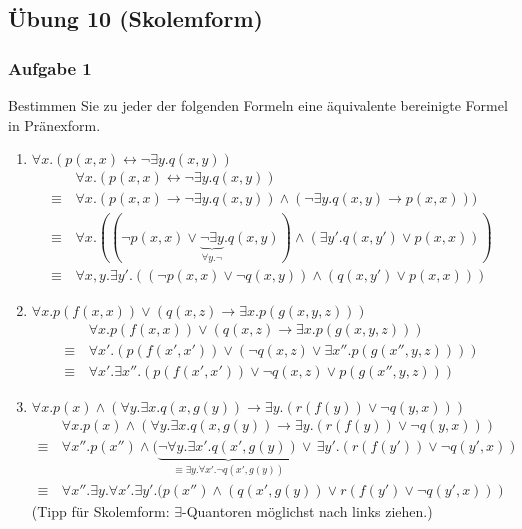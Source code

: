 \newcommand{\HRule}[2]{\par
  \vspace*{\dimexpr-\parskip-\baselineskip+#2}
  \noindent\rule{#1}{0.2mm}\par
  \vspace*{\dimexpr-\parskip-.5\baselineskip+#2}}

\subsection*{Übung 10 (Skolemform)}
\subsubsection*{Aufgabe 1}
Bestimmen Sie zu jeder der folgenden Formeln eine äquivalente bereinigte Formel in Pränexform.
\begin{enumerate}
\item $\forall x.(p(x,x) \leftrightarrow \neg \exists y.q(x,y))$ \\
\LOES 
\begin{align*}
& \forall x.(p(x,x) \leftrightarrow \neg \exists y.q(x,y)) \\ 
\equiv\, & \forall x.(p(x,x) \to \neg \exists y.q(x,y)) \land (\neg \exists y.q(x,y) \to p(x,x))) \\
\equiv\, & \forall x.((\neg p(x,x) \lor \underbrace{\neg \exists y}_{\forall y.\neg}.q(x,y)) \land (\exists y'.q(x,y') \lor p(x,x))) \\
\equiv\, & \forall x,y.\exists y'.((\neg p(x,x) \lor \neg q(x,y)) \land (q(x,y') \lor p(x,x)))
\end{align*}
\item $\forall x.p(f(x,x)) \lor (q(x,z) \to \exists x.p(g(x,y,z)))$ \\
\LOES 
\begin{align*}
& \forall x.p(f(x,x)) \lor (q(x,z) \to \exists x.p(g(x,y,z))) \\
\equiv\, & \forall x'.(p(f(x',x')) \lor (\neg q(x,z) \lor \exists x''.p(g(x'',y,z)))) \\
\equiv\, & \forall x'.\exists x''.(p(f(x',x')) \lor \neg q(x,z) \lor p(g(x'',y,z)))
\end{align*}
\item $\forall x.p(x) \land (\forall y.\exists x.q(x,g(y)) \to \exists y.(r(f(y)) \lor \neg q(y,x)))$ \\
\LOES
\begin{align*}
& \forall x.p(x) \land (\forall y.\exists x.q(x,g(y)) \to \exists y.(r(f(y)) \lor \neg q(y,x))) \\
\equiv\, & \forall x''.p(x'') \land (\underbrace{\neg\forall y.\exists x'.q(x',g(y))}_{\equiv \exists y.\forall x'.\neg q(x',g(y))} \lor \, \exists y'.(r(f(y')) \lor \neg q(y',x)) \\
\equiv\, & \forall x''.\exists y.\forall x'.\exists y'.(p(x'') \land (q(x',g(y)) \lor r(f(y') \lor \neg q(y',x)))
\end{align*}
(Tipp für Skolemform: $\exists$-Quantoren möglichst nach links ziehen.)
\end{enumerate}
